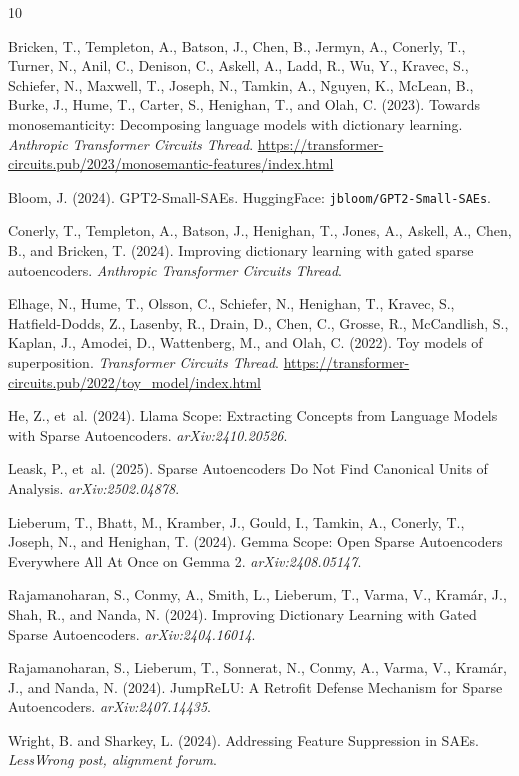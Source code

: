\documentclass[11pt,a4paper]{article}
\begin{document}
\newpage

\begin{thebibliography}{10}

Bricken, T., Templeton, A., Batson, J., Chen, B., Jermyn, A., Conerly, T., Turner,
N., Anil, C., Denison, C., Askell, A., Ladd, R., Wu, Y., Kravec, S., Schiefer, N.,
Maxwell, T., Joseph, N., Tamkin, A., Nguyen, K., McLean, B., Burke, J., Hume, T.,
Carter, S., Henighan, T., and Olah, C. (2023).
Towards monosemanticity: Decomposing language models with dictionary learning.
\emph{Anthropic Transformer Circuits Thread}.
\url{https://transformer-circuits.pub/2023/monosemantic-features/index.html}

Bloom, J. (2024).
GPT2-Small-SAEs. HuggingFace: \texttt{jbloom/GPT2-Small-SAEs}.

Conerly, T., Templeton, A., Batson, J., Henighan, T., Jones, A., Askell, A.,
Chen, B., and Bricken, T. (2024).
Improving dictionary learning with gated sparse autoencoders.
\emph{Anthropic Transformer Circuits Thread}.

Elhage, N., Hume, T., Olsson, C., Schiefer, N., Henighan, T., Kravec, S.,
Hatfield-Dodds, Z., Lasenby, R., Drain, D., Chen, C., Grosse, R., McCandlish, S.,
Kaplan, J., Amodei, D., Wattenberg, M., and Olah, C. (2022).
Toy models of superposition.
\emph{Transformer Circuits Thread}.
\url{https://transformer-circuits.pub/2022/toy_model/index.html}

He, Z., et~al. (2024).
Llama Scope: Extracting Concepts from Language Models with Sparse Autoencoders.
\emph{arXiv:2410.20526}.

Leask, P., et~al. (2025).
Sparse Autoencoders Do Not Find Canonical Units of Analysis.
\emph{arXiv:2502.04878}.

Lieberum, T., Bhatt, M., Kramber, J., Gould, I., Tamkin, A., Conerly, T.,
Joseph, N., and Henighan, T. (2024).
Gemma Scope: Open Sparse Autoencoders Everywhere All At Once on Gemma 2.
\emph{arXiv:2408.05147}.

Rajamanoharan, S., Conmy, A., Smith, L., Lieberum, T., Varma, V., Kram{\'a}r, J.,
Shah, R., and Nanda, N. (2024).
Improving Dictionary Learning with Gated Sparse Autoencoders.
\emph{arXiv:2404.16014}.

Rajamanoharan, S., Lieberum, T., Sonnerat, N., Conmy, A., Varma, V., Kram{\'a}r, J.,
and Nanda, N. (2024).
JumpReLU: A Retrofit Defense Mechanism for Sparse Autoencoders.
\emph{arXiv:2407.14435}.

Wright, B. and Sharkey, L. (2024).
Addressing Feature Suppression in SAEs.
\emph{LessWrong post, alignment forum}.

\end{thebibliography}
\end{document}
